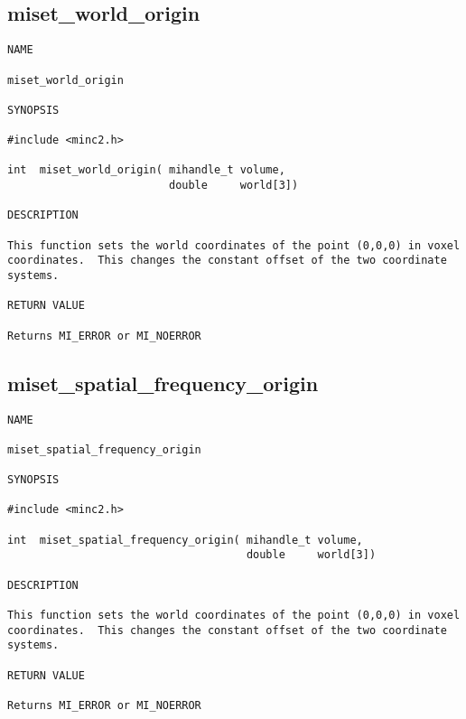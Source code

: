 \documentclass{article}
\begin{document}
\subsection{miset\_world\_origin}
\begin{verbatim}
NAME 

miset_world_origin

SYNOPSIS

#include <minc2.h>

int  miset_world_origin( mihandle_t volume,
                         double     world[3])
                       
DESCRIPTION

This function sets the world coordinates of the point (0,0,0) in voxel
coordinates.  This changes the constant offset of the two coordinate
systems.

RETURN VALUE

Returns MI_ERROR or MI_NOERROR

\end{verbatim}

\subsection{miset\_spatial\_frequency\_origin}
\begin{verbatim}
NAME 

miset_spatial_frequency_origin

SYNOPSIS

#include <minc2.h>

int  miset_spatial_frequency_origin( mihandle_t volume,
                                     double     world[3])
                       
DESCRIPTION

This function sets the world coordinates of the point (0,0,0) in voxel
coordinates.  This changes the constant offset of the two coordinate
systems.

RETURN VALUE

Returns MI_ERROR or MI_NOERROR

\end{verbatim}
\end{document}
